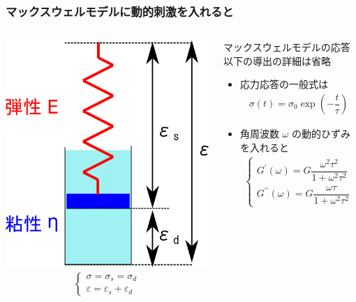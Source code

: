 \documentclass[12pt, dvipdfmx]{beamer}
\begin{document}
\begin{frame}
	\frametitle{マックスウェルモデルに動的刺激を入れると}
		\begin{columns}[c, onlytextwidth]
				\vspace{3mm}
				\includegraphics[width=.9\textwidth]{Maxwell_model.png}
				\begin{align*}
					\begin{cases}
						\sigma = \sigma_s = \sigma_d \\
						\varepsilon = \varepsilon_s + \varepsilon_d
					\end{cases}
				\end{align*}
				\begin{block}{マックスウェルモデルの応答}
					\alert{以下の導出の詳細は省略}
					\begin{itemize}
						\item 応力応答の一般式は
						\begin{align*}
							\sigma(t) = \sigma_0 \exp \left( - \dfrac{t}{\tau} \right)
						\end{align*}
						\item 角周波数 $\omega$ の動的ひずみを入れると
						\begin{align*}
							\begin{cases}
								G^{\prime}(\omega) = G\dfrac{\omega^2 \tau^2}{1+\omega^2\tau^2} \\[12pt]
								G^{\prime \prime}(\omega) = G\dfrac{\omega \tau}{1+\omega^2\tau^2}
							\end{cases}
						\end{align*}
					\end{itemize}		
				\end{block}
		\end{columns}
\end{frame}
\end{document}
